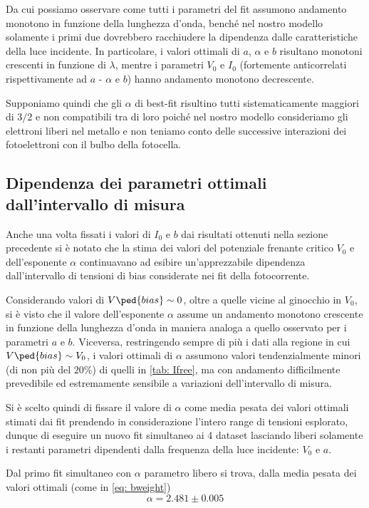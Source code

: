 \documentclass[10pt, a4paper, italian]{article}
\begin{document}
Da cui possiamo osservare come tutti i parametri del fit assumono andamento
monotono in funzione della lunghezza d'onda, benché nel nostro modello
solamente i primi due dovrebbero racchiudere la dipendenza dalle
caratteristiche della luce incidente.
In particolare, i valori ottimali di $a$, $\alpha$ e $b$ risultano monotoni
crescenti in funzione di $\lambda$, mentre i parametri $V_0$ e $I_0$
(fortemente anticorrelati rispettivamente ad $a$ - $\alpha$ e $b$) hanno
andamento monotono decrescente.

Supponiamo quindi che gli $\alpha$ di best-fit risultino tutti sistematicamente
maggiori di $3/2$ e non compatibili tra di loro poiché nel nostro modello
consideriamo gli elettroni liberi nel metallo e non teniamo conto delle
successive interazioni dei fotoelettroni con il bulbo della fotocella.

\subsection{Dipendenza dei parametri ottimali dall'intervallo di misura}
Anche una volta fissati i valori di $I_0$ e $b$ dai risultati ottenuti nella
sezione precedente si è notato che la stima dei valori del potenziale frenante
critico $V_0$ e dell'esponente $\alpha$ continuavano ad esibire
un'apprezzabile dipendenza dall'intervallo di tensioni di bias considerate nei
fit della fotocorrente.

Considerando valori di $V\ped{bias} \sim 0$, oltre a quelle vicine al ginocchio
in $V_0$, si è visto che il valore dell'esponente $\alpha$ assume un
andamento monotono crescente in funzione della lunghezza d'onda in maniera
analoga a quello osservato per i parametri $a$ e $b$. Viceversa, restringendo
sempre di più i dati alla regione in cui $V\ped{bias} \sim V_0$, i valori
ottimali di $\alpha$ assumono valori tendenzialmente minori (di non più del
$20 \%$) di quelli in \cref{tab: Ifree}, ma con andamento difficilmente
prevedibile ed estremamente sensibile a variazioni dell'intervallo di misura.

Si è scelto quindi di fissare il valore di $\alpha$ come media pesata dei
valori ottimali stimati dai fit prendendo in considerazione l'intero range di
tensioni esplorato, dunque di eseguire un nuovo fit simultaneo ai 4 dataset
lasciando liberi solamente i restanti parametri dipendenti dalla frequenza
della luce incidente: $V_0$ e $a$.

Dal primo fit simultaneo con $\alpha$ parametro libero si trova, dalla
media pesata dei valori ottimali (come in \cref{eq: bweight})
\[
\alpha = 2.481 \pm 0.005
\]
\end{document}
